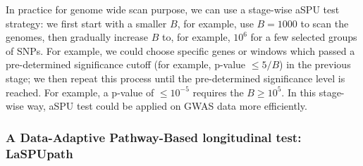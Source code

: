 \documentclass[12pt]{article}
\begin{document}
In practice for genome wide scan purpose, we can use a stage-wise aSPU test strategy: we first start with a smaller $B$, for example, use $B = 1000$ to scan the genomes, then gradually increase $B$ to, for example, $10^6$ for a few selected groups of SNPs. For example, we could choose specific genes or windows which passed a pre-determined significance cutoff (for example, p-value $ \leq 5/B$) in the previous stage; we then repeat this process until the pre-determined significance level is reached. For example, a p-value of $\leq 10 ^ {-5}$ requires the $B \geq 10^5$. In this stage-wise way, aSPU test could be applied on GWAS data more efficiently. 
%
\subsubsection{A Data-Adaptive Pathway-Based longitudinal test: LaSPUpath}
\end{document}
